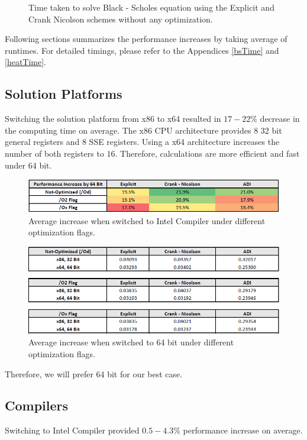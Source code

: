 \documentclass[12pt, oneside]{book}
\theoremstyle{plain}
\theoremstyle{definition}
\begin{document}
\begin{figure}[!htb]
\begin{minipage}[b]{0.5\textwidth}
    \caption{Time taken to solve Black - Scholes equation using the Explicit and Crank Nicolson schemes without any optimization.}
  \end{minipage}
\end{figure}

Following sections summarizes the performance increases by taking average of runtimes. For detailed timings, please refer to the Appendices \ref{bsTime} and \ref{heatTime}.

\subsection{Solution Platforms} 
Switching the solution platform from x86 to x64 resulted in $17 - 22 \%$ decrease in the computing time on average.  The x86 CPU architecture provides $8$ 32 bit general registers and $8$ SSE registers. Using a x64 architecture increases the number of both registers  to $16$. Therefore, calculations are more efficient and fast under 64 bit.

\begin{figure}[!htb]
    \centering
        \includegraphics[scale=0.8]{bitPercent.png}
    \caption{Average increase when switched to Intel Compiler under different optimization flags.}
    \label{bitPercent}
\end{figure}

\begin{figure}[!htb]
    \centering
        \includegraphics[scale=0.8]{bit.png}
    \caption{Average increase when switched to 64 bit under different optimization flags.}
\end{figure}

Therefore, we will prefer 64 bit for our best case.

\subsection{Compilers} 
Switching to Intel Compiler provided $0.5 - 4.3 \%$ performance increase on average. 
\end{document}
